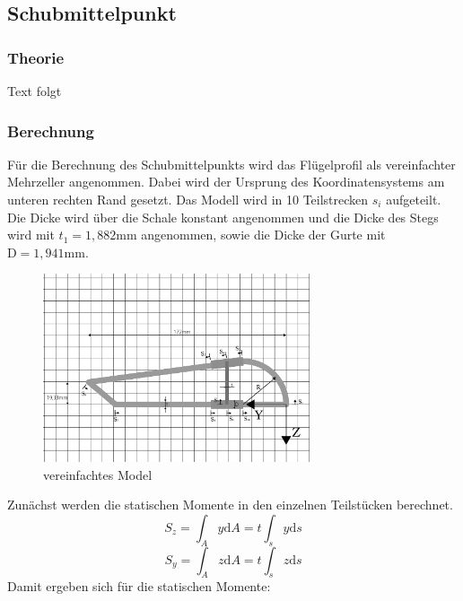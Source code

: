 
\subsection{Schubmittelpunkt}
\subsubsection{Theorie}
Text folgt
\subsubsection{Berechnung}
Für die Berechnung des Schubmittelpunkts wird das Flügelprofil als vereinfachter Mehrzeller angenommen.
Dabei wird der Ursprung des Koordinatensystems am unteren rechten Rand gesetzt. Das Modell wird in 10 Teilstrecken $s_{i}$ aufgeteilt. Die Dicke wird über die Schale konstant angenommen und die Dicke des Stegs wird mit $t_{1}=1,882\mathrm{mm}$ angenommen, sowie die Dicke der Gurte mit $\mathrm{D}=1,941\mathrm{mm}$.
\begin{figure}[h]
 \centering
 \includegraphics[width=0.7\textwidth]{Bilder/Model1}
 \caption{vereinfachtes Model}
 \label{fig:Model1}
\end{figure}

Zunächst werden die statischen Momente in den einzelnen Teilstücken berechnet.
\begin{equation}
	S_{z}=\int_{A}^{}y \mathrm{d}A =t\int_{s}^{}y \mathrm{d}s
\end{equation}
\begin{equation}
	S_{y}=\int_{A}^{}z \mathrm{d}A =t\int_{s}^{}z \mathrm{d}s 
\end{equation}
Damit ergeben sich für die statischen Momente:

